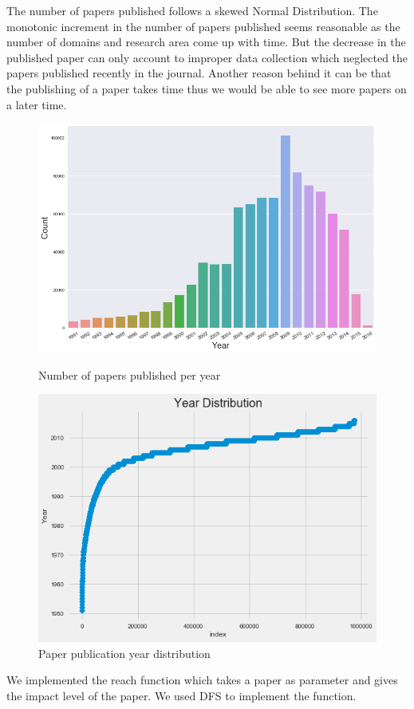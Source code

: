 \documentclass[a4paper, 11pt]{article}
\begin{document}
The number of papers published follows a skewed Normal Distribution. The monotonic increment in the number of papers published seems reasonable as the number of domains and research area come up with time. But the decrease in the published paper can only account to improper data collection which neglected the papers published recently in the journal. Another reason behind it can be that the publishing of a paper takes time thus we would be able to see more papers on a later time.

\begin{figure}[ht]
    \centering
    \begin{minipage}{0.45\textwidth}
        \centering
        \includegraphics[width=1.2\textwidth]{year-distribution.png}
        \caption{Number of papers published per year}
    \end{minipage}\hfill
    \begin{minipage}{0.45\textwidth}
        \centering
        \includegraphics[width=.9\textwidth]{year_graph.png}
        \caption{Paper publication year distribution}
    \end{minipage}
\end{figure}
\FloatBarrier
We implemented the reach function which takes a paper as parameter and gives the impact level of the paper. We used DFS to implement the function. 
\end{document}
